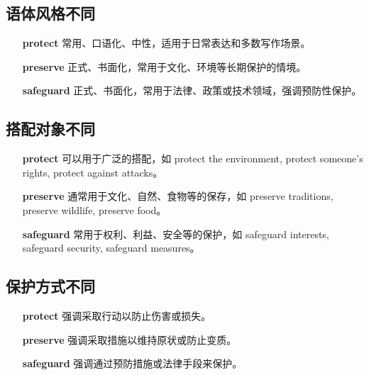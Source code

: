 \documentclass[12pt]{article}
\begin{document}
\subsection*{语体风格不同}
\begin{itemize}
\item[\textbf{protect}] 常用、口语化、中性，适用于日常表达和多数写作场景。
\item[\textbf{preserve}] 正式、书面化，常用于文化、环境等长期保护的情境。
\item[\textbf{safeguard}] 正式、书面化，常用于法律、政策或技术领域，强调预防性保护。
\end{itemize}
\subsection*{搭配对象不同}
\begin{itemize}
\item[\textbf{protect}] 可以用于广泛的搭配，如 protect the environment, protect someone's rights, protect against attacks。
\item[\textbf{preserve}] 通常用于文化、自然、食物等的保存，如 preserve traditions, preserve wildlife, preserve food。
\item[\textbf{safeguard}] 常用于权利、利益、安全等的保护，如 safeguard interests, safeguard security, safeguard measures。
\end{itemize}
\subsection*{保护方式不同}
\begin{itemize}
\item[\textbf{protect}] 强调采取行动以防止伤害或损失。
\item[\textbf{preserve}] 强调采取措施以维持原状或防止变质。
\item[\textbf{safeguard}] 强调通过预防措施或法律手段来保护。
\end{itemize}
\end{document}
